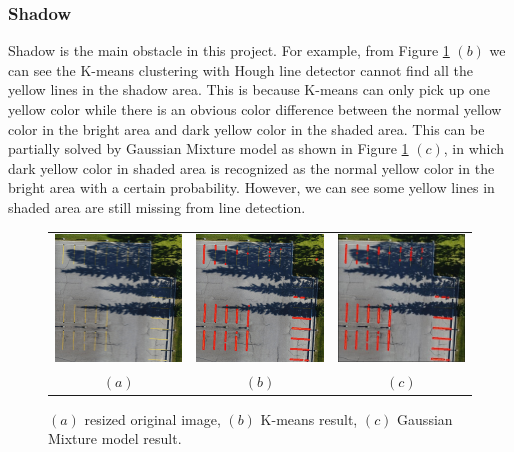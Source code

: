 \documentclass{m2pi}
\begin{document}
\subsubsection{Shadow}

Shadow is the main obstacle in this project. For example, from Figure \ref{lot11result} $(b)$ we can see the K-means clustering with Hough line detector cannot find all the yellow lines in the shadow area. This is because K-means can only pick up one yellow color while there is an obvious color difference between the normal yellow color in the bright area and dark yellow color in the shaded area. This can be partially solved by Gaussian Mixture model as shown in Figure \ref{lot11result} $(c)$, in which dark yellow color in shaded area is recognized as the normal yellow color in the bright area with a certain probability. However, we can see some yellow lines in shaded area are still missing from line detection.

\begin{figure}[htp]
\centering
\begin{tabular}{ccc}
\includegraphics[width=3.8cm]{figures/Resized_Lot11.jpg}&
\includegraphics[width=3.8cm]{figures/Boxed_Lot11.jpg}&
\includegraphics[width=3.8cm]{figures/detected_Lot11.jpg}\\
$(a)$ & $(b)$ & $(c)$
\end{tabular}
\caption{$(a)$ resized original image, $(b)$ K-means result,
$(c)$ Gaussian Mixture model result.}
\label{lot11result}
\end{figure}
\end{document}
